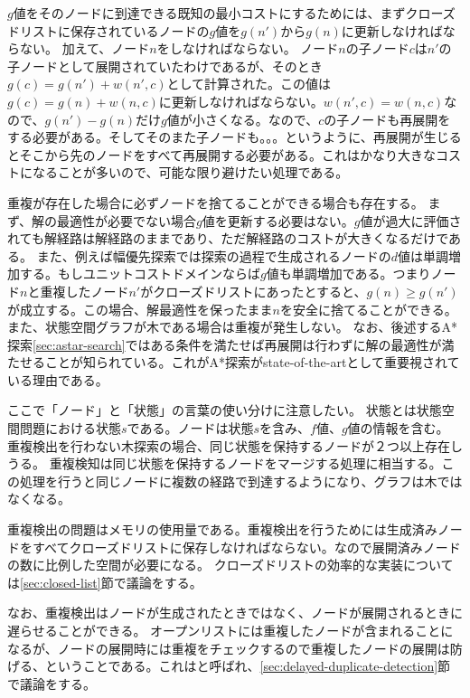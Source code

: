 $g$値をそのノードに到達できる既知の最小コストにするためには、まずクローズドリストに保存されているノードの$g$値を$g(n')$から$g(n)$に更新しなければならない。
加えて、ノード$n$をしなければならない。
ノード$n$の子ノード$c$は$n'$の子ノードとして展開されていたわけであるが、そのとき$g(c) = g(n') + w(n', c)$として計算された。この値は$g(c) = g(n) + w(n, c)$に更新しなければならない。$w(n', c) = w(n, c)$なので、$g(n') - g(n)$だけ$g$値が小さくなる。なので、$c$の子ノードも再展開をする必要がある。そしてそのまた子ノードも。。。というように、再展開が生じるとそこから先のノードをすべて再展開する必要がある。これはかなり大きなコストになることが多いので、可能な限り避けたい処理である。


重複が存在した場合に必ずノードを捨てることができる場合も存在する。
まず、解の最適性が必要でない場合$g$値を更新する必要はない。$g$値が過大に評価されても解経路は解経路のままであり、ただ解経路のコストが大きくなるだけである。
また、例えば幅優先探索では探索の過程で生成されるノードの$d$値は単調増加する。もしユニットコストドメインならば$g$値も単調増加である。つまりノード$n$と重複したノード$n'$がクローズドリストにあったとすると、$g(n) \geq g(n')$が成立する。この場合、解最適性を保ったまま$n$を安全に捨てることができる。
また、状態空間グラフが木である場合は重複が発生しない。
なお、後述するA*探索\ref{sec:astar-search}ではある条件を満たせば再展開は行わずに解の最適性が満たせることが知られている。これがA*探索がstate-of-the-artとして重要視されている理由である。

ここで「ノード」と「状態」の言葉の使い分けに注意したい。
状態とは状態空間問題における状態$s$である。ノードは状態$s$を含み、$f$値、$g$値の情報を含む。
重複検出を行わない木探索の場合、同じ状態を保持するノードが２つ以上存在しうる。
重複検知は同じ状態を保持するノードをマージする処理に相当する。この処理を行うと同じノードに複数の経路で到達するようになり、グラフは木ではなくなる。

重複検出の問題はメモリの使用量である。重複検出を行うためには生成済みノードをすべてクローズドリストに保存しなければならない。なので展開済みノードの数に比例した空間が必要になる。
クローズドリストの効率的な実装については\ref{sec:closed-list}節で議論をする。

なお、重複検出はノードが生成されたときではなく、ノードが展開されるときに遅らせることができる。
オープンリストには重複したノードが含まれることになるが、ノードの展開時には重複をチェックするので重複したノードの展開は防げる、ということである。これはと呼ばれ、\ref{sec:delayed-duplicate-detection}節で議論をする。



